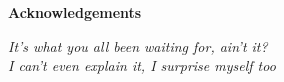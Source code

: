 \documentclass[../../main.tex]{subfiles}
\begin{document}
\thispagestyle{empty}
\newenvironment{acknowledgements}%
    {\cleardoublepage\thispagestyle{empty}\null\vfill\begin{center}%
    \vspace{0pt}
    \bfseries Acknowledgements\end{center}}%
    {\vfill\null}
        \begin{acknowledgements}
\textit{It's what you all been waiting for, ain't it?}\\


\textit{I can't even explain it, I surprise myself too}\\

        \end{acknowledgements}
\end{document}

